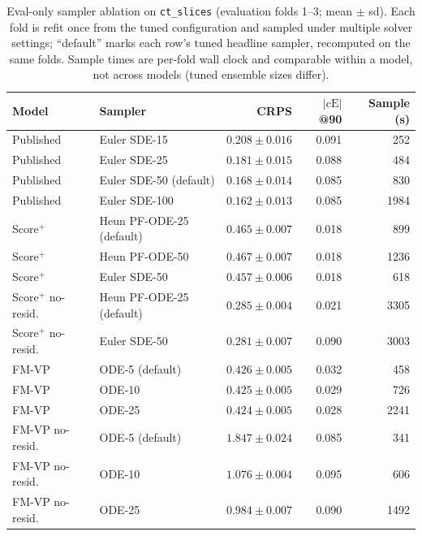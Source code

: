 \documentclass{article}
\begin{document}
\begin{table}[!h]
  \centering
  \caption{Eval-only sampler ablation on \texttt{ct\_slices} (evaluation folds 1--3; mean $\pm$ sd). Each fold is refit once from the tuned configuration and sampled under multiple solver settings; ``default'' marks each row's tuned headline sampler, recomputed on the same folds. Sample times are per-fold wall clock and comparable within a model, not across models (tuned ensemble sizes differ).}\label{tab:ct-slices-solver}
  \scriptsize
  \begin{tabular}{llrrr}
    \toprule
    Model & Sampler & CRPS & $|\text{cE}|$@90 & Sample (s) \\
    \midrule
    Published & Euler SDE-15 & $0.208 \pm 0.016$ & 0.091 & 252 \\
    Published & Euler SDE-25 & $0.181 \pm 0.015$ & 0.088 & 484 \\
    Published & Euler SDE-50 (default) & $0.168 \pm 0.014$ & 0.085 & 830 \\
    Published & Euler SDE-100 & $0.162 \pm 0.013$ & 0.085 & 1984 \\
    \midrule
    Score$^+$ & Heun PF-ODE-25 (default) & $0.465 \pm 0.007$ & 0.018 & 899 \\
    Score$^+$ & Heun PF-ODE-50 & $0.467 \pm 0.007$ & 0.018 & 1236 \\
    Score$^+$ & Euler SDE-50 & $0.457 \pm 0.006$ & 0.018 & 618 \\
    \midrule
    Score$^+$ no-resid. & Heun PF-ODE-25 (default) & $0.285 \pm 0.004$ & 0.021 & 3305 \\
    Score$^+$ no-resid. & Euler SDE-50 & $0.281 \pm 0.007$ & 0.090 & 3003 \\
    \midrule
    FM-VP & ODE-5 (default) & $0.426 \pm 0.005$ & 0.032 & 458 \\
    FM-VP & ODE-10 & $0.425 \pm 0.005$ & 0.029 & 726 \\
    FM-VP & ODE-25 & $0.424 \pm 0.005$ & 0.028 & 2241 \\
    \midrule
    FM-VP no-resid. & ODE-5 (default) & $1.847 \pm 0.024$ & 0.085 & 341 \\
    FM-VP no-resid. & ODE-10 & $1.076 \pm 0.004$ & 0.095 & 606 \\
    FM-VP no-resid. & ODE-25 & $0.984 \pm 0.007$ & 0.090 & 1492 \\
    \bottomrule
  \end{tabular}
\end{table}
\end{document}
